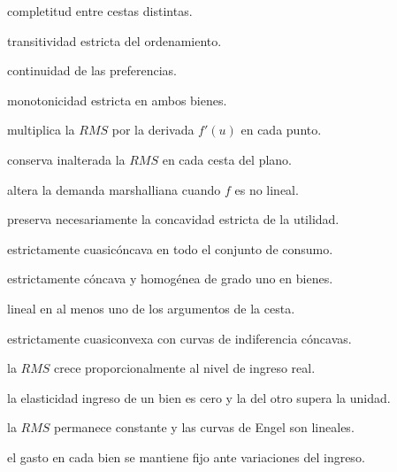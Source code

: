 \begin{opts}
    \item completitud entre cestas distintas.
    \item transitividad estricta del ordenamiento.
    \item continuidad de las preferencias.
    \item monotonicidad estricta en ambos bienes.
\end{opts}

\begin{opts}
    \item multiplica la $RMS$ por la derivada $f'(u)$ en cada punto.
    \item conserva inalterada la $RMS$ en cada cesta del plano.
    \item altera la demanda marshalliana cuando $f$ es no lineal.
    \item preserva necesariamente la concavidad estricta de la utilidad.
\end{opts}

\begin{opts}
    \item estrictamente cuasicóncava en todo el conjunto de consumo.
    \item estrictamente cóncava y homogénea de grado uno en bienes.
    \item lineal en al menos uno de los argumentos de la cesta.
    \item estrictamente cuasiconvexa con curvas de indiferencia cóncavas.
\end{opts}

\begin{opts}
    \item la $RMS$ crece proporcionalmente al nivel de ingreso real.
    \item la elasticidad ingreso de un bien es cero y la del otro supera la unidad.
    \item la $RMS$ permanece constante y las curvas de Engel son lineales.
    \item el gasto en cada bien se mantiene fijo ante variaciones del ingreso.
\end{opts}

